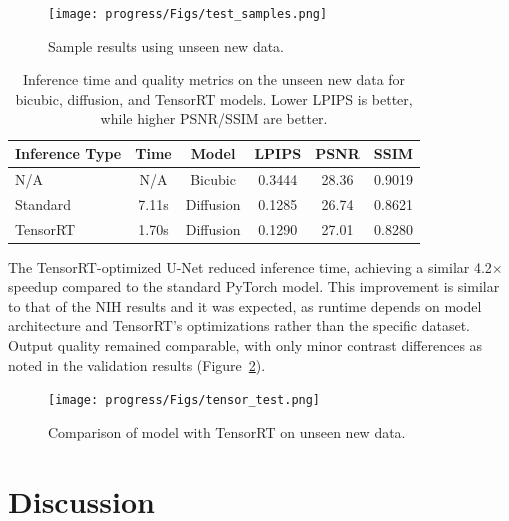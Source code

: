 \documentclass{article} %
\begin{document}
\begin{figure}[h]
\begin{center}
\texttt{[image: progress/Figs/test\_samples.png]}
\end{center}
\caption{Sample results using unseen new data.}
\label{test_samples}
\end{figure}

\begin{table}[h]
\centering
\caption{Inference time and quality metrics on the unseen new data for bicubic, diffusion, and TensorRT models. Lower LPIPS is better, while higher PSNR/SSIM are better.}
\label{tab:test_results}
\begin{tabular}{l c c c c c}
\toprule
\textbf{Inference Type} & 
\textbf{Time} & 
\textbf{Model} & 
\textbf{LPIPS} & 
\textbf{PSNR} & 
\textbf{SSIM} \\
\midrule
N/A        & N/A   & Bicubic   & 0.3444 & 28.36 & 0.9019 \\
Standard   & 7.11s & Diffusion & 0.1285 & 26.74 & 0.8621 \\
TensorRT   & 1.70s & Diffusion & 0.1290 & 27.01 & 0.8280 \\
\bottomrule
\end{tabular}
\end{table}

The TensorRT-optimized U-Net reduced inference time, achieving a similar 4.2$\times$ speedup compared to the standard PyTorch model. This improvement is similar to that of the NIH results and it was expected, as runtime depends on model architecture and TensorRT’s optimizations rather than the specific dataset. Output quality remained comparable, with only minor contrast differences as noted in the validation results (Figure~\ref{tensor_test}).

\begin{figure}[h]
\begin{center}
\texttt{[image: progress/Figs/tensor\_test.png]}
\end{center}
\caption{Comparison of model with TensorRT on unseen new data.}
\label{tensor_test}
\end{figure}

\section{Discussion}
\end{document}
